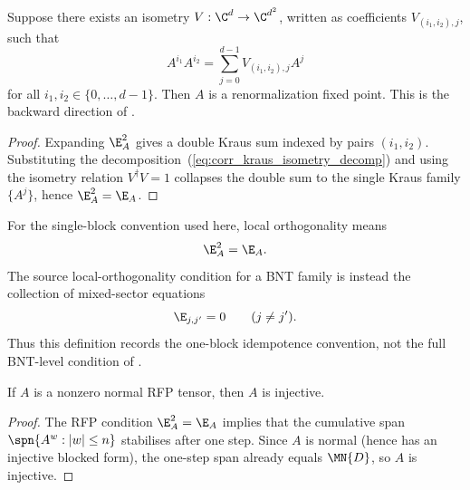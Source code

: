 \begin{theorem}\label{thm:kraus_isometry_implies_rfp}
    \leanok
    Suppose there exists an isometry
    $V : \C^d \to \C^{d^2}$, written as coefficients $V_{(i_1,i_2),j}$, such
    that
    \begin{equation}\label{eq:corr_kraus_isometry_decomp}
        A^{i_1} A^{i_2} = \sum_{j=0}^{d-1} V_{(i_1,i_2),j} A^j
    \end{equation}
    for all $i_1,i_2 \in \{0,\ldots,d-1\}$.
    Then $A$ is a renormalization fixed point.
    This is the backward direction of \cite[Theorem~3.1]{Cirac2016MPDO_arXiv}.
\end{theorem}
\begin{proof}\leanok
    Expanding $\E_A^2$ gives a double Kraus sum indexed by pairs $(i_1,i_2)$.
    Substituting the decomposition~(\ref{eq:corr_kraus_isometry_decomp}) and
    using the isometry relation
    $V^\dagger V = 1$ collapses the double sum to the single Kraus family
    $\{A^j\}$, hence $\E_A^2 = \E_A$.
\end{proof}

\begin{definition}%
    \label{def:is_locally_orthogonal}
    \leanok
    For the single-block convention used here, local orthogonality means
    \[
        \E_A^2=\E_A .
    \]
    The source local-orthogonality condition for a BNT family is instead the
    collection of mixed-sector equations
    \[
        \E_{j,j'}=0 \qquad (j\ne j').
    \]
    Thus this definition records the one-block idempotence convention, not the
    full BNT-level condition of \cite[Definition~3.5]{Cirac2016MPDO_arXiv}.
\end{definition}

\begin{theorem}\label{thm:rfp_nt_injective}
    \leanok
    If $A$ is a nonzero normal RFP tensor, then $A$ is injective.
\end{theorem}
\begin{proof}\leanok
    The RFP condition $\E_A^2 = \E_A$ implies that the cumulative span
    $\spn\{A^w : |w| \le n\}$ stabilises after one step.
    Since $A$ is normal (hence has an injective blocked form),
    the one-step span already equals $\MN{D}$, so $A$ is injective.
\end{proof}

